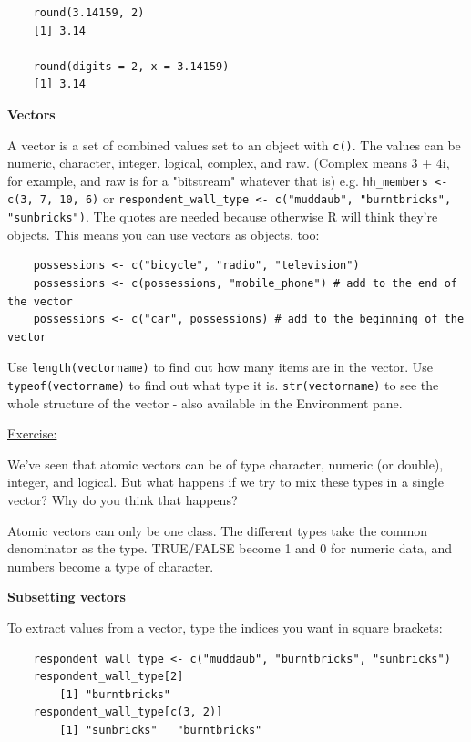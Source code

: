 \documentclass[12pt]{article}
\begin{document}
\begin{verbatim}
    round(3.14159, 2)
    [1] 3.14

    round(digits = 2, x = 3.14159)
    [1] 3.14
\end{verbatim}

\textbf{Vectors}

A vector is a set of combined values set to an object with \texttt{c()}. The values can be numeric, character, integer, logical, complex, and raw. (Complex means 3 + 4i, for example, and raw is for a "bitstream" whatever that is) e.g. \texttt{hh\_members <- c(3, 7, 10, 6)} or \texttt{respondent\_wall\_type <- c("muddaub", "burntbricks", "sunbricks")}. The quotes are needed because otherwise R will think they're objects. This means you can use vectors as objects, too:
\begin{verbatim}
    possessions <- c("bicycle", "radio", "television")
    possessions <- c(possessions, "mobile_phone") # add to the end of the vector
    possessions <- c("car", possessions) # add to the beginning of the vector
\end{verbatim}

Use \texttt{length(vectorname)} to find out how many items are in the vector. Use \texttt{typeof(vectorname)} to find out what type it is. \texttt{str(vectorname)} to see the whole structure of the vector - also available in the Environment pane.

\vspace{0.5em}
\begin{addmargin}[1cm]{0cm}
\color{gray}
\underline{Exercise:}

We’ve seen that atomic vectors can be of type character, numeric (or double), integer, and logical. But what happens if we try to mix these types in a single vector? Why do you think that happens? 

\color{black}\vspace{0.5em}

Atomic vectors can only be one class. The different types take the common denominator as the type. TRUE/FALSE become 1 and 0 for numeric data, and numbers become a type of character. 

\end{addmargin}

\textbf{Subsetting vectors}

To extract values from a vector, type the indices you want in square brackets:

\vspace{-0.5em}\begin{verbatim}
    respondent_wall_type <- c("muddaub", "burntbricks", "sunbricks")
    respondent_wall_type[2]
        [1] "burntbricks"
    respondent_wall_type[c(3, 2)]
        [1] "sunbricks"   "burntbricks"
\end{verbatim}
\end{document}
